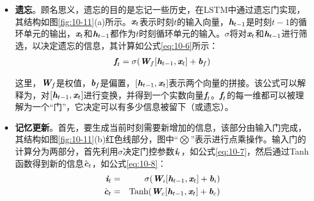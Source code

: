\begin{itemize}
\vspace{0.5em}
\item {\small\sffamily\bfseries{遗忘}}。顾名思义，遗忘的目的是忘记一些历史，在LSTM中通过遗忘门实现，其结构如图\ref{fig:10-11}(a)所示。$\textbf{\em x}_{t}$表示时刻$t$的输入向量，$\textbf{\em h}_{t-1}$是时刻$t-1$的循环单元的输出，$\textbf{\em x}_{t}$和$\textbf{\em h}_{t-1}$都作为$t$时刻循环单元的输入。$\sigma$将对$\textbf{\em x}_{t}$和$\textbf{\em h}_{t-1}$进行筛选，以决定遗忘的信息，其计算如公式\eqref{eq:10-6}所示：
\begin{eqnarray}
\textbf{\em f}_t=\sigma(\textbf{\em W}_f [\textbf{\em h}_{t-1},\textbf{\em x}_{t}] + \textbf{\em b}_f )
\label{eq:10-6}
\end{eqnarray}

这里，$\textbf{\em W}_f$是权值，$\textbf{\em b}_f$是偏置，$[\textbf{\em h}_{t-1},\textbf{\em x}_{t}]$表示两个向量的拼接。该公式可以解释为，对$[\textbf{\em h}_{t-1},\textbf{\em x}_{t}]$进行变换，并得到一个实数向量$\textbf{\em f}_t$。$\textbf{\em f}_t$的每一维都可以被理解为一个“门”，它决定可以有多少信息被留下（或遗忘）。
\vspace{0.5em}
\item {\small\sffamily\bfseries{记忆更新}}。首先，要生成当前时刻需要新增加的信息，该部分由输入门完成，其结构如图\ref{fig:10-11}(b)红色线部分，图中“$\bigotimes$”表示进行点乘操作。输入门的计算分为两部分，首先利用$\sigma$决定门控参数$\textbf{\em i}_t$，如公式\eqref{eq:10-7}，然后通过Tanh函数得到新的信息$\hat{\textbf{\em c}}_t$，如公式\eqref{eq:10-8}：
\begin{eqnarray}
\textbf{\em i}_t & = & \sigma (\textbf{\em W}_i [\textbf{\em h}_{t-1},\textbf{\em x}_{t}] + \textbf{\em b}_i ) \label{eq:10-7} \\
\hat{\textbf{\em c}}_t & = & \textrm{Tanh} (\textbf{\em W}_c [\textbf{\em h}_{t-1},\textbf{\em x}_{t}] + \textbf{\em b}_c ) \label{eq:10-8}
\end{eqnarray}


\end{itemize}
